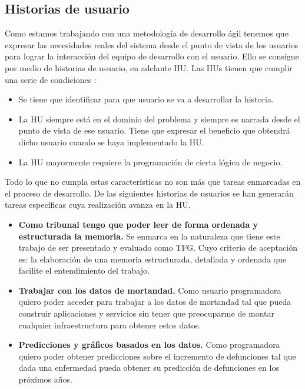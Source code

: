 \subsection{Historias de usuario}
\label{sec:hu2}
Como estamos trabajando con una metodología de desarrollo ágil tenemos que expresar las
necesidades reales del sistema desde el punto de vista de los usuarios para lograr la
interacción del equipo de desarrollo con el usuario. Ello se consigue por medio de
historias de usuario, en adelante HU. Las HUs tienen que cumplir una serie de condiciones \cite{dddjj}:
\begin{itemize}
    \item Se tiene que identificar para que usuario se va a desarrollar la historia.
    \item La HU siempre está en el dominio del problema y siempre es narrada desde el
    punto de vista de ese usuario. Tiene que expresar el beneficio que obtendrá dicho
    usuario cuando se haya implementado la HU.
    \item La HU mayormente requiere la programación de cierta lógica de negocio. 
\end{itemize}
Todo lo que no cumpla estas características no son más que tareas enmarcadas en el proceso
de desarrollo. De las siguientes historias de usuarios se han generarán tareas específicas
cuya realización avanza en la HU.
\begin{itemize}
    \item \textbf{Como tribunal tengo que poder leer de forma ordenada y estructurada la
    memoria.} 
    Se enmarca en la naturaleza que tiene este trabajo de ser presentado y
    evaluado como TFG. Cuyo criterio de aceptación es: la elaboración de una memoria
    estructurada, detallada y ordenada que facilite el entendimiento del trabajo.

    \item \textbf{Trabajar con los datos de mortandad.}
    Como usuario programadora
    quiero poder acceder para trabajar a los datos de mortandad
    tal que pueda construir aplicaciones y servicios sin tener que preocuparme de montar cualquier infraestructura para obtener estos datos.

    \item \textbf{Predicciones y gráficos basados en los datos.}
    Como programadora quiero poder obtener predicciones sobre el incremento de defunciones
    tal que dada una enfermedad pueda obtener su predicción de defunciones en los próximos años.
\end{itemize}

